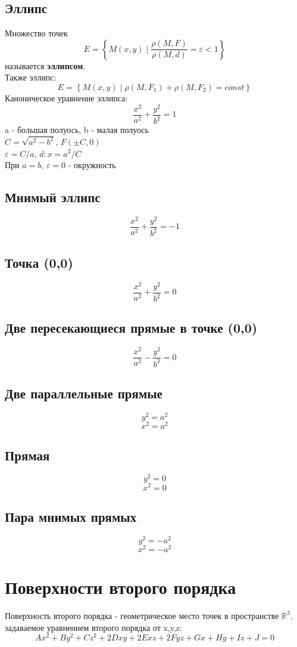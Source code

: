 \subsection{Эллипс}
Множество точек 
$$E=\left\{ M(x,y)\mid \frac{\rho(M,F)}{\rho(M,d)}=\varepsilon<1 \right\}
$$ называется \textbf{эллипсом}.\\
Также эллипс:
$$E=\left\{ M(x,y)\mid \rho(M,F_1)+\rho(M,F_2)=const \right\} $$
Каноническое уравнение эллипса:
$$\boxed{\frac{x^2}{a^2}+\frac{y^2}{b^2}=1}$$
a - большая полуось, b - малая полуось\\
$C=\sqrt{a^2-b^2}$, $F(\pm C,0)$\\
$\varepsilon=C/a$, $d:x=a^2/C$\\
При $a=b$, $\varepsilon=0$ - окружность

\subsection{Мнимый эллипс}
$$\frac{x^2}{a^2}+\frac{y^2}{b^2}=-1$$
\subsection{Точка (0,0)}
$$\frac{x^2}{a^2}+\frac{y^2}{b^2}=0$$
\subsection{Две пересекающиеся прямые в точке (0,0)}
$$\frac{x^2}{a^2}-\frac{y^2}{b^2}=0$$
\subsection{Две параллельные прямые}
$$y^2=a^2$$
$$x^2=a^2$$
\subsection{Прямая}
$$y^2=0$$
$$x^2=0$$
\subsection{Пара мнимых прямых}
$$y^2=-a^2$$
$$x^2=-a^2$$



\section{Поверхности второго порядка}
\begin{defin}
Поверхность второго порядка - геометрическое место точек в пространстве
$\mathbb R^3$, задаваемое уравнением второго порядка от x,y,z:
$$Ax^2+By^2+Cz^2+2Dxy+2Exz+2Fyz+Gx+Hy+Iz+J=0$$
\end{defin}
